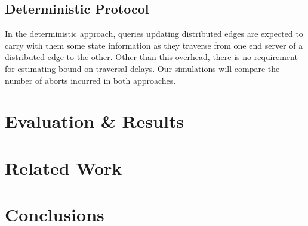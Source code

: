 \documentclass[sigplan,screen]{acmart}
\begin{document}
\subsection{Deterministic Protocol}

In the deterministic approach, queries updating distributed edges are expected to carry with them some state information as they traverse from one end server of a distributed edge to the other. Other than this overhead, there is no requirement for estimating bound on traversal delays. Our simulations will compare the number of aborts incurred in both approaches.

\section{Evaluation \& Results}

\section{Related Work}

\section{Conclusions}





\end{document}
